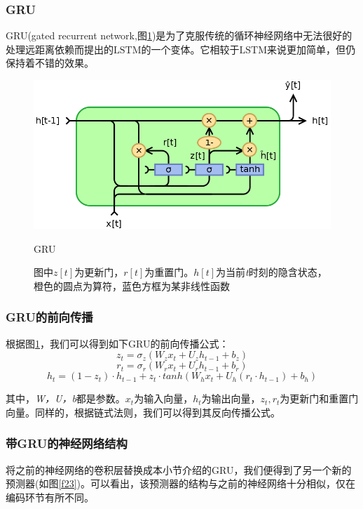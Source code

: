 \documentclass[12pt]{template}
\begin{document}
\subsubsection{GRU}
GRU(gated recurrent network,图\ref{f22})是为了克服传统的循环神经网络中无法很好的处理远距离依赖而提出的$\mathrm{LSTM}$的一个变体。它相较于$\mathrm{LSTM}$来说更加简单，但仍保持着不错的效果\cite{DBLP:journals/corr/ChungGCB14}。

\begin{figure}[htb]
    \centering
    \includegraphics[width=13.5cm]{GRU.png}
    \caption{GRU}
    \captionsetup{font=footnotesize,margin=30pt}\caption*{图中\(z[t]\)为更新门，\(r[t]\)为重置门。\(h[t]\)为当前\textit{t}时刻的隐含状态，橙色的圆点为算符，蓝色方框为某非线性函数}
    \label{f22}
\end{figure}

\subsubsection{GRU的前向传播}
根据图\ref{f22}，我们可以得到如下GRU的前向传播公式：
\begin{equation}
z_t=\sigma_z(W_zx_t+U_zh_{t-1}+b_z) 
\end{equation}
\begin{equation}
r_t=\sigma_r(W_rx_t+U_rh_{t-1}+b_r) 
\end{equation}
\begin{equation}
h_t=(1-z_t)\cdot h_{t-1}+z_t\cdot tanh(W_hx_t+U_h(r_t\cdot h_{t-1})+b_h)
\end{equation}

其中，\textit{W，U，b}都是参数。\(x_t\)为输入向量，\(h_t\)为输出向量，\(z_t,r_t\)为更新门和重置门向量。同样的，根据链式法则，我们可以得到其反向传播公式。
\subsubsection{带GRU的神经网络结构}
将之前的神经网络的卷积层替换成本小节介绍的GRU，我们便得到了另一个新的预测器(如图\ref{f23})。可以看出，该预测器的结构与之前的神经网络十分相似，仅在编码环节有所不同。
\end{document}
